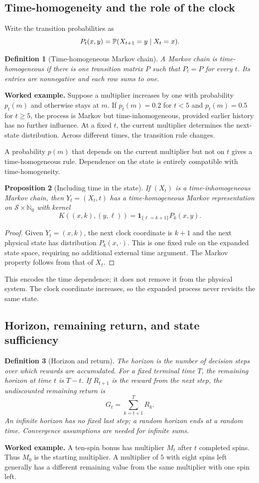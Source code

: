 \documentclass[11pt]{article}
\newtheorem{definition}{Definition}[section]
\newtheorem{proposition}[definition]{Proposition}
\theoremstyle{remark}\newtheorem{remark}[definition]{Remark}
\begin{document}
\newpage
\subsection{Time-homogeneity and the role of the clock}
Write the transition probabilities as
\[
P_t(x,y)=\mathbb P(X_{t+1}=y\mid X_t=x).
\]
\begin{definition}[Time-homogeneous Markov chain]
A Markov chain is time-homogeneous if there is one transition matrix $P$ such that $P_t=P$ for every $t$. Its entries are nonnegative and each row sums to one.
\end{definition}
\textbf{Worked example.} Suppose a multiplier increases by one with probability $p_t(m)$ and otherwise stays at $m$. If $p_t(m)=0.2$ for $t<5$ and $p_t(m)=0.5$ for $t\geq5$, the process is Markov but time-inhomogeneous, provided earlier history has no further influence. At a fixed $t$, the current multiplier determines the next-state distribution. Across different times, the transition rule changes.

A probability $p(m)$ that depends on the current multiplier but not on $t$ gives a time-homogeneous rule. Dependence on the state is entirely compatible with time-homogeneity.
\begin{proposition}[Including time in the state]
If $(X_t)$ is a time-inhomogeneous Markov chain, then $Y_t=(X_t,t)$ has a time-homogeneous Markov representation on $\mathcal S\times\mathbb N_0$ with kernel
\[
K((x,k),(y,\ell))=\mathbf1_{\{\ell=k+1\}}P_k(x,y).
\]
\end{proposition}
\begin{proof}
Given $Y_t=(x,k)$, the next clock coordinate is $k+1$ and the next physical state has distribution $P_k(x,\cdot)$. This is one fixed rule on the expanded state space, requiring no additional external time argument. The Markov property follows from that of $X_t$.
\end{proof}
This encodes the time dependence; it does not remove it from the physical system. The clock coordinate increases, so the expanded process never revisits the same state.

\subsection{Horizon, remaining return, and state sufficiency}
\begin{definition}[Horizon and return]
The horizon is the number of decision steps over which rewards are accumulated. For a fixed terminal time $T$, the remaining horizon at time $t$ is $T-t$. If $R_{t+1}$ is the reward from the next step, the undiscounted remaining return is
\[
G_t=\sum_{k=t+1}^{T}R_k.
\]
An infinite horizon has no fixed last step; a random horizon ends at a random time. Convergence assumptions are needed for infinite sums.
\end{definition}
\textbf{Worked example.} A ten-spin bonus has multiplier $M_t$ after $t$ completed spins. Thus $M_0$ is the starting multiplier. A multiplier of $5$ with eight spins left generally has a different remaining value from the same multiplier with one spin left.
\end{document}
